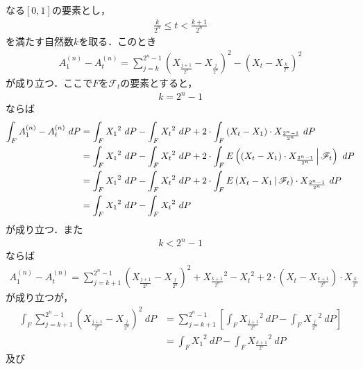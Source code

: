 \begin{sketch}
\begin{description}
				なる$[0,1]$の要素とし，
				\begin{align}
					\frac{k}{2^{n}} \leq t < \frac{k+1}{2^{n}}
				\end{align}
				を満たす自然数$k$を取る．このとき
				\begin{align}
					A^{(n)}_{1} - A^{(n)}_{t}
					= \sum_{j=k}^{2^{n}-1} \left( X_{\frac{j+1}{2^{n}}} - X_{\frac{j}{2^{n}}} \right)^{2}
					- \left( X_{t} - X_{\frac{k}{2^{n}}} \right)^{2}
				\end{align}
				が成り立つ．ここで$F$を$\mathscr{F}_{t}$の要素とすると，
				\begin{align}
					k = 2^{n} - 1
				\end{align}
				ならば
				\begin{align}
					\int_{F} A^{(n)}_{1} - A^{(n)}_{t}\ dP
					&= \int_{F} {X_{1}}^{2}\ dP - \int_{F} {X_{t}}^{2}\ dP 
					+ 2 \cdot \int_{F} \left(X_{t} - X_{1}\right) \cdot X_{\frac{2^{n}-1}{2^{n}}}\ dP \\
					&= \int_{F} {X_{1}}^{2}\ dP - \int_{F} {X_{t}}^{2}\ dP
					+ 2 \cdot \int_{F} E\left( \left(X_{t} - X_{1}\right) \cdot X_{\frac{2^{n}-1}{2^{n}}} \, \middle|\, \mathscr{F}_{t} \right)\ dP \\
					&= \int_{F} {X_{1}}^{2}\ dP - \int_{F} {X_{t}}^{2}\ dP
					+ 2 \cdot \int_{F} E\left( X_{t} - X_{1} \, \middle|\, \mathscr{F}_{t} \right) \cdot X_{\frac{2^{n}-1}{2^{n}}}\ dP \\
					&= \int_{F} {X_{1}}^{2}\ dP - \int_{F} {X_{t}}^{2}\ dP
				\end{align}
				が成り立つ．また
				\begin{align}
					k < 2^{n} - 1
				\end{align}
				ならば
				\begin{align}
					A^{(n)}_{1} - A^{(n)}_{t}
					= \sum_{j=k+1}^{2^{n}-1} \left( X_{\frac{j+1}{2^{n}}} - X_{\frac{j}{2^{n}}} \right)^{2}
					+ {X_{\frac{k+1}{2^{n}}}}^{2} - {X_{t}}^{2}
					+ 2 \cdot \left( X_{t} - X_{\frac{k+1}{2^{n}}} \right) \cdot X_{\frac{k}{2^{n}}}
				\end{align}
				が成り立つが，
				\begin{align}
					\int_{F} \sum_{j=k+1}^{2^{n}-1} \left( X_{\frac{j+1}{2^{n}}} - X_{\frac{j}{2^{n}}} \right)^{2}\ dP
					&= \sum_{j=k+1}^{2^{n}-1} \left[\int_{F} {X_{\frac{j+1}{2^{n}}}}^{2}\ dP
					- \int_{F} {X_{\frac{j}{2^{n}}}}^{2}\ dP\right] \\
					&= \int_{F} {X_{1}}^{2}\ dP - \int_{F} {X_{\frac{k+1}{2^{n}}}}^{2}\ dP
				\end{align}
				及び
				\begin{align}

\end{align}
\end{description}
\end{sketch}
